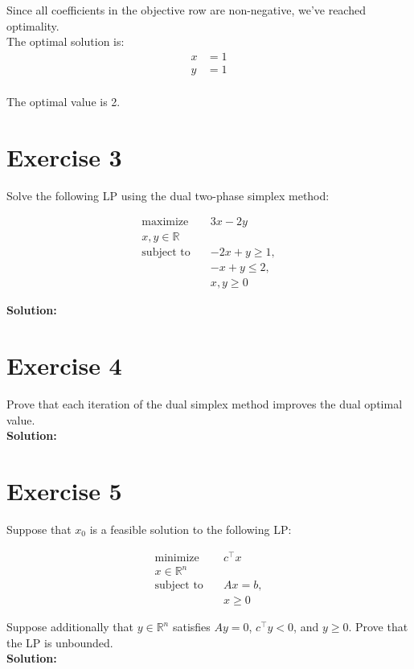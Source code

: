 \documentclass{article}
\begin{document}
Since all coefficients in the objective row are non-negative, we've reached optimality. \\

The optimal solution is:
\begin{align*}
x &= 1\\
y &= 1\\
\end{align*}

The optimal value is 2.

\newpage

\section*{Exercise 3}
Solve the following LP using the dual two-phase simplex method:

\begin{align*}
\text{maximize} \quad & 3x - 2y\\
x, y \in \mathbb{R} \quad & \\
\text{subject to} \quad & -2x + y \geq 1,\\
& -x + y \leq 2,\\
& x, y \geq 0
\end{align*}

\textbf{Solution:} \\



\newpage

\section*{Exercise 4}
Prove that each iteration of the dual simplex method improves the dual optimal value. \\

\textbf{Solution:} \\



\newpage

\section*{Exercise 5}
Suppose that $x_0$ is a feasible solution to the following LP:

\begin{align*}
\text{minimize} \quad & c^\top x\\
x \in \mathbb{R}^n \quad & \\
\text{subject to} \quad & Ax = b,\\
& x \geq 0
\end{align*}

Suppose additionally that $y \in \mathbb{R}^n$ satisfies $Ay = 0$, $c^\top y < 0$, and $y \geq 0$. Prove that the LP is unbounded. \\

\textbf{Solution:} \\
\end{document}
